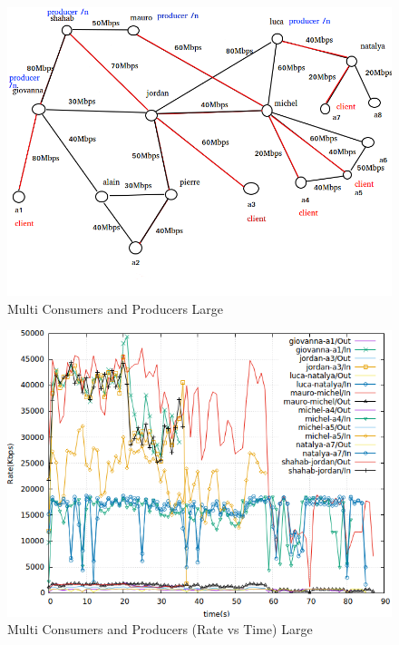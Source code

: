 \begin{figure}[H]

\begin{center}


\includegraphics[scale = 0.4]{Figures/Multi-Repo-Client.png}

\caption{Multi Consumers and Producers Large} \label{Multi-Repo-Client} 


\end{center}

\end{figure}




\begin{figure}[H]

\begin{center}


\includegraphics[scale = 0.4]{Figures/multi-repo-client.png}

\caption{Multi Consumers and Producers (Rate vs Time) Large} \label{multi-repo-client} 


\end{center}

\end{figure}

